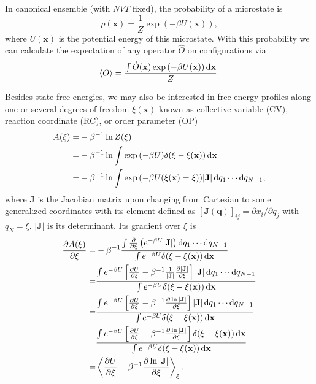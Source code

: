 In canonical ensemble (with $NVT$ fixed), the probability of a microstate is
\begin{equation}
\rho(\mathbf{x})=\frac{1}{Z}\exp{(-\beta U(\mathbf{x}))},
\end{equation}
where $U(\mathbf{x})$ is the potential energy of this microstate. With this probability we can calculate the expectation of any operator $\hat{O}$ on configurations via
\begin{equation}
\left<O\right>=\frac{\int \hat{O}(\mathbf{x})\exp{(-\beta U(\mathbf{x}))}\mathop{}\!\mathrm{d}\mathbf{x}}{Z}.
\end{equation}

Besides state free energies, we may also be interested in free energy profiles along one or several degrees of freedom $\xi(\mathbf{x})$ known as collective variable (CV), reaction coordinate (RC), or order parameter (OP) 
\begin{align}
	A(\xi)=&-\beta^{-1}\ln{Z(\xi)}\notag\\
	      =&-\beta^{-1}\ln\int \exp{\left(-\beta U\right)}\delta(\xi-\xi(\mathbf{x}))\mathop{}\!\mathrm{d}\mathbf{x}\notag\\
	      =&-\beta^{-1}\ln\int \exp{\left(-\beta U(\xi(\mathbf{x})=\xi)\right)}|\mathbf{J}|\mathop{}\!\mathrm{d} q_1\cdots \mathop{}\!\mathrm{d} q_{N-1},
\end{align}
where $\mathbf{J}$ is the Jacobian matrix upon changing from Cartesian to some generalized coordinates with its element defined as $\left[\mathbf{J}(\mathbf{q})\right]_{ij}=\partial x_i/\partial q_j$ with $q_N=\xi$. $|\mathbf{J}|$ is its determinant. Its gradient over $\xi$ is
\begin{align}
\frac{\partial A(\xi)}{\partial \xi}=&-\beta^{-1}\frac{\int \frac{\partial}{\partial \xi}\left(e^{-\beta U}|\mathbf{J}|\right)\diff q_1\cdots \diff q_{N-1}}{\int e^{-\beta U}\delta(\xi-\xi(\mathbf{x}))\diff\mathbf{x}}\notag\\
                                    =&\frac{\int e^{-\beta U}\left[\frac{\partial U}{\partial \xi}-\beta^{-1}\frac{1}{|\mathbf{J}|}\frac{\partial |\mathbf{J}|}{\partial \xi}\right]|\mathbf{J}|\diff q_1\cdots \diff q_{N-1}}{\int e^{-\beta U}\delta(\xi-\xi(\mathbf{x}))\diff \mathbf{x}}\notag\\
                                    =&\frac{\int e^{-\beta U}\left[\frac{\partial U}{\partial \xi}-\beta^{-1}\frac{\partial \ln|\mathbf{J}|}{\partial \xi}\right]|\mathbf{J}|\diff q_1\cdots \diff q_{N-1}}{\int e^{-\beta U}\delta(\xi-\xi(\mathbf{x}))\diff \mathbf{x}}\notag\\
                                    =&\frac{\int e^{-\beta U}\left[\frac{\partial U}{\partial \xi}-\beta^{-1}\frac{\partial \ln|\mathbf{J}|}{\partial \xi}\right]\delta(\xi-\xi(\mathbf{x}))\diff\mathbf{x}}{\int e^{-\beta U}\delta(\xi-\xi(\mathbf{x}))\diff \mathbf{x}}\notag\\
                                    =&\left<\frac{\partial U}{\partial \xi}-\beta^{-1}\frac{\partial \ln |\mathbf{J}|}{\partial \xi}\right>_\xi.
                                    \label{Eq:Intro:meanforce}
\end{align}
